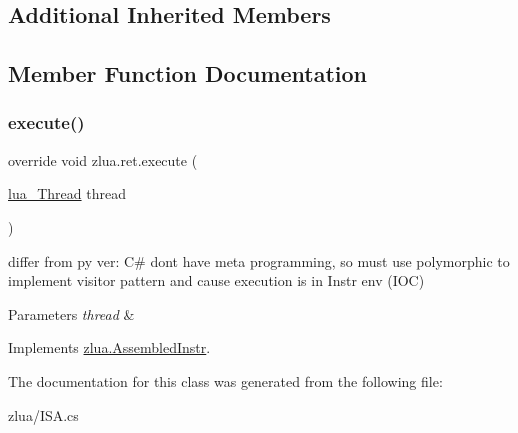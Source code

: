 \subsection*{Additional Inherited Members}


\subsection{Member Function Documentation}
\mbox{\label{classzlua_1_1ret_a0c334b18dbe8e21c26aa785269b29253}} 
\subsubsection{\texorpdfstring{execute()}{execute()}}
{\footnotesize\ttfamily override void zlua.\+ret.\+execute (\begin{DoxyParamCaption}\item[{\mbox{\hyperlink{classzlua_1_1lua___thread}{lua\+\_\+\+Thread}}}]{thread }\end{DoxyParamCaption})\hspace{0.3cm}{\ttfamily [virtual]}}



differ from py ver\+: C\# dont have meta programming, so must use polymorphic to implement visitor pattern and cause execution is in Instr env (I\+OC) 


\begin{DoxyParams}{Parameters}
{\em thread} & \\
\hline
\end{DoxyParams}


Implements \mbox{\hyperlink{classzlua_1_1_assembled_instr_a44e081c4565b90b75e4a67b8dd418feb}{zlua.\+Assembled\+Instr}}.



The documentation for this class was generated from the following file\+:\begin{DoxyCompactItemize}
\item 
zlua/I\+S\+A.\+cs\end{DoxyCompactItemize}
